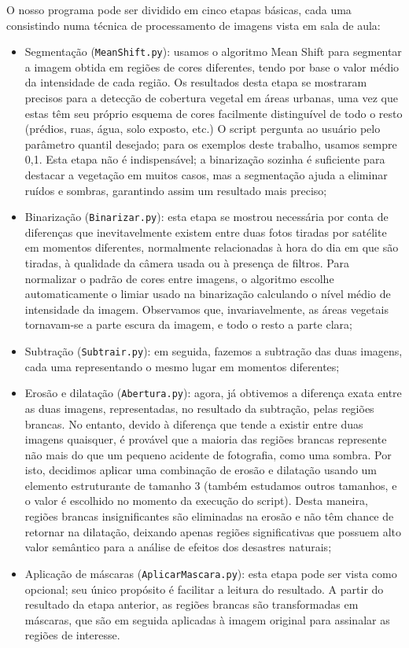 \documentclass{article}
\begin{document}
O nosso programa pode ser dividido em cinco etapas básicas, cada uma consistindo numa técnica de processamento de imagens vista em sala de aula:
\begin{itemize}
  \item Segmentação (\texttt{MeanShift.py}): usamos o algoritmo Mean Shift para segmentar a imagem obtida em regiões de cores diferentes, tendo por base o valor médio da intensidade de cada região. Os resultados desta etapa se mostraram precisos para a detecção de cobertura vegetal em áreas urbanas, uma vez que estas têm seu próprio esquema de cores facilmente distinguível de todo o resto (prédios, ruas, água, solo exposto, etc.) O script pergunta ao usuário pelo parâmetro quantil desejado; para os exemplos deste trabalho, usamos sempre 0,1. Esta etapa não é indispensável; a binarização sozinha é suficiente para destacar a vegetação em muitos casos, mas a segmentação ajuda a eliminar ruídos e sombras, garantindo assim um resultado mais preciso;
  \item Binarização (\texttt{Binarizar.py}): esta etapa se mostrou necessária por conta de diferenças que inevitavelmente existem entre duas fotos tiradas por satélite em momentos diferentes, normalmente relacionadas à hora do dia em que são tiradas, à qualidade da câmera usada ou à presença de filtros. Para normalizar o padrão de cores entre imagens, o algoritmo escolhe automaticamente o limiar usado na binarização calculando o nível médio de intensidade da imagem. Observamos que, invariavelmente, as áreas vegetais tornavam-se a parte escura da imagem, e todo o resto a parte clara;
  \item Subtração (\texttt{Subtrair.py}): em seguida, fazemos a subtração das duas imagens, cada uma representando o mesmo lugar em momentos diferentes;
  \item Erosão e dilatação (\texttt{Abertura.py}): agora, já obtivemos a diferença exata entre as duas imagens, representadas, no resultado da subtração, pelas regiões brancas. No entanto, devido à diferença que tende a existir entre duas imagens quaisquer, é provável que a maioria das regiões brancas represente não mais do que um pequeno acidente de fotografia, como uma sombra. Por isto, decidimos aplicar uma combinação de erosão e dilatação usando um elemento estruturante de tamanho 3 (também estudamos outros tamanhos, e o valor é escolhido no momento da execução do script). Desta maneira, regiões brancas insignificantes são eliminadas na erosão e não têm chance de retornar na dilatação, deixando apenas regiões significativas que possuem alto valor semântico para a análise de efeitos dos desastres naturais;
  \item Aplicação de máscaras (\texttt{AplicarMascara.py}): esta etapa pode ser vista como opcional; seu único propósito é facilitar a leitura do resultado. A partir do resultado da etapa anterior, as regiões brancas são transformadas em máscaras, que são em seguida aplicadas à imagem original para assinalar as regiões de interesse.
\end{itemize}
\end{document}

